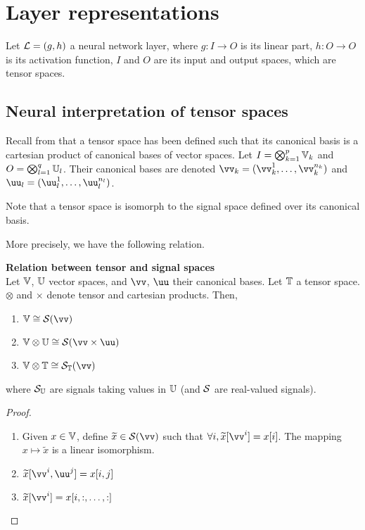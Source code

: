 \section{Layer representations}

Let $\mathcal{L} = (g,h)$ a neural network layer, where $g: I \rightarrow O$ is its linear part, $h : O \rightarrow O$ is its activation function, $I$ and $O$ are its input and output spaces, which are tensor spaces. 

\subsection{Neural interpretation of tensor spaces}

Recall from  that a tensor space has been defined such that its canonical basis is a cartesian product of canonical bases of vector spaces. Let $I = \bigotimes_{k=1}^p \mathbb{V}_k$ and $O =  \bigotimes_{l=1}^q \mathbb{U}_l$.
Their canonical bases are denoted $\vv_k = (\vv_k^1, \ldots, \vv_k^{n_k})$ and $\uu_l = (\uu_l^1, \ldots, \uu_l^{n_l})$.

\begin{remark}
Note that a tensor space is isomorph to the signal space defined over its canonical basis.
\end{remark}

More precisely, we have the following relation.

\begin{lemma}\textbf{Relation between tensor and signal spaces}\\
Let $\mathbb{V}$, $\mathbb{U}$ vector spaces, and $\vv$, $\uu$ their canonical bases. Let $\mathbb{T}$ a tensor space. $\otimes$ and $\times$ denote tensor and cartesian products. Then,
\begin{enumerate}[label=(\roman*)]
  \item $\bbv \cong \cs(\vv)$
  \item $\bbv \otimes \bbu \cong \cs(\vv \times \uu)$
  \item $\bbv \otimes \bbt \cong \cs_{\bbt}(\vv)$
\end{enumerate}
where $\mathcal{S}_{\mathbb{U}}$ are signals taking values in $\mathbb{U}$ (and $\mathcal{S}$ are real-valued signals).
\label{lem:relts}
\end{lemma}
\begin{proof}
\begin{enumerate}[label=(\roman*)]
  \item Given $x \in \mathbb{V}$, define $\widetilde{x} \in \cs(\vv)$ such that $\forall i, \widetilde{x}[\vv^i] = x[i]$. The mapping $x \mapsto \widetilde{x}$ is a linear isomorphism. \label{enum:li}
  \item $\widetilde{x}[\vv^i, \uu^j] = x[i,j]$
  \item $\widetilde{x}[\vv^i] = x[i,:,\ldots,:]$
\end{enumerate}
\end{proof}

